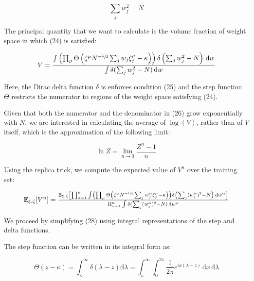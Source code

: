 \begin{equation}
    \sum_j w_j^2 = N
\end{equation}

The principal quantity that we want to calculate is the volume fraction of weight space in which (24) is satisfied:

\begin{equation}
    V = \frac{\int \left(\prod_\mu \Theta \left( \zeta^\mu N^{-\sfrac{1}{2}} \sum_j w_{j} \xi_j^\mu - \kappa \right) \right) \delta \left( \sum_j w_j^2 - N \right) \, \mathrm{d} w}{\int \delta(\sum_j w_j^2 - N) \, \mathrm{d} w}
\end{equation}

Here, the Dirac delta function $\delta$ is enforces condition (25) and the step function $\Theta$ restricts the numerator to regions of the weight space satisfying (24).

Given that both the numerator and the denominator in (26) grow exponentially with $N$, we are interested in calculating the average of $\log (V)$, rather than of $V$ itself, which is the approximation of the following limit:

\begin{equation}
    \ln Z = \lim_{n \longrightarrow 0} \frac{Z^n - 1}{n}
\end{equation}

Using the replica trick, we compute the expected value of $V^n$ over the training set:

\begin{equation}
    \textstyle{\mathbb{E}_{\xi, \zeta} [V^n] = \frac{\mathbb{E}_{\xi, \zeta} \left [\prod_{\alpha=1}^n \int \left( \prod_\mu \Theta \left( \zeta^\mu N^{-\sfrac{1}{2}} \sum_j w_{j}^\alpha \xi_j^\mu - \kappa \right) \right) \delta \left( \sum_j (w_j^\alpha)^2 - N \right) \, \mathrm{d} w^\alpha \right] }{\Pi_{\alpha=1}^n \int \delta(\sum_j (w_j^\alpha)^2 - N) \, \mathrm{d} w^\alpha}}
\end{equation}

We proceed by simplifying (28) using integral representations of the step and delta functions.

The step function can be written in its integral form as:

\begin{equation}
    \Theta(z - \kappa) = \int_\kappa^{\infty} \delta(\lambda - z) \mathrm{d} \lambda = \int_\kappa^{\infty} \int_0^{2 \pi} \frac{1}{2\pi} e^{ix(\lambda - z)} \, \mathrm{d} x \, \mathrm{d} \lambda
\end{equation}

